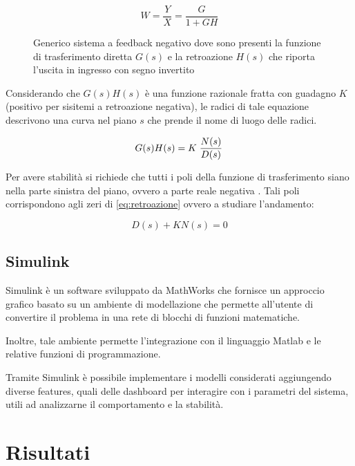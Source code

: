 \begin{equation}
	W=\frac{Y}{X}=\frac{G}{1+G H}
\end{equation}


\begin{figure}[t!]
	\centering
	\centering
\footnotesize{\def\svgwidth{0.95\linewidth}
	}
	\caption{Generico sistema a feedback negativo dove sono presenti la funzione di trasferimento diretta $G(s)$ e la retroazione $H(s)$ che riporta l'uscita in ingresso con segno invertito}
	\label{fig:sistema}
\end{figure}


Considerando che $G(s)H(s)$ è una funzione razionale fratta con guadagno $K$ (positivo per sisitemi a retroazione negativa), le radici di tale equazione descrivono una curva nel piano $s$ che prende il nome di luogo delle radici. 

\begin{equation}
	G(s)H(s)=K\left.N(s)\over D(s)\right.
\end{equation}

Per avere stabilità si richiede che tutti i poli della funzione di trasferimento siano nella parte sinistra del piano, ovvero a parte reale negativa \cite{marro_controlli_2004}. Tali poli corrispondono agli zeri di \cref{eq:retroazione} ovvero a studiare l'andamento:

\begin{equation}
D(s)+KN(s)=0
\end{equation}




\subsection{Simulink}

Simulink \cite{simulink} è un software sviluppato da MathWorks che fornisce un approccio grafico basato su un ambiente di modellazione che permette all’utente di convertire il problema in una rete di blocchi di funzioni matematiche.

Inoltre, tale ambiente permette l’integrazione con il linguaggio Matlab e le relative funzioni di programmazione.

Tramite Simulink è possibile implementare i modelli considerati aggiungendo diverse features, quali delle dashboard per interagire con i parametri del sistema, utili ad analizzarne il comportamento e la stabilità.

\section{Risultati}

